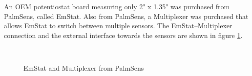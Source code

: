\documentclass[DIV=calc, paper=letterpaper, fontsize=11pt, twocolumn]{scrartcl}	 %
\begin{document}
An OEM potentiostat board measuring only 2" x 1.35" was purchased from PalmSens, called EmStat.
Also from PalmSens, a Multiplexer was purchased that allows EmStat to switch between multiple sensors.
The EmStat--Multiplexer connection and the external interface towards the sensors are shown in figure \ref{emstat}.

\begin{figure}[tb]
\centering
{}	\quad
{}	\\
	\quad
{}
\caption{EmStat and Multiplexer from PalmSens \cite{mux-documentation}}
\label{emstat}
\end{figure}
\end{document}
